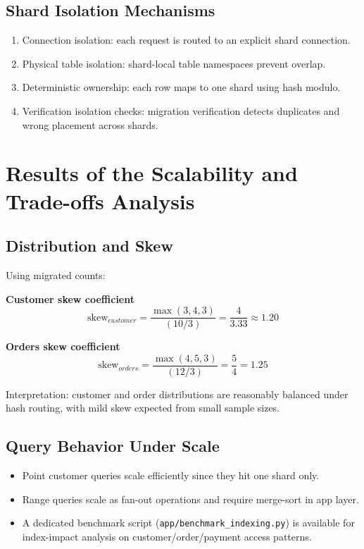 \documentclass[12pt,a4paper]{article}
\begin{document}
\subsection{Shard Isolation Mechanisms}

\begin{enumerate}[leftmargin=*]
  \item Connection isolation: each request is routed to an explicit shard connection.
  \item Physical table isolation: shard-local table namespaces prevent overlap.
  \item Deterministic ownership: each row maps to one shard using hash modulo.
  \item Verification isolation checks: migration verification detects duplicates and
  wrong placement across shards.
\end{enumerate}

\section{Results of the Scalability and Trade-offs Analysis}

\subsection{Distribution and Skew}

Using migrated counts:

\textbf{Customer skew coefficient}
\[
\text{skew}_{customer} = \frac{\max(3,4,3)}{(10/3)} = \frac{4}{3.33} \approx 1.20
\]

\textbf{Orders skew coefficient}
\[
\text{skew}_{orders} = \frac{\max(4,5,3)}{(12/3)} = \frac{5}{4} = 1.25
\]

Interpretation:
customer and order distributions are reasonably balanced under hash routing,
with mild skew expected from small sample sizes.

\subsection{Query Behavior Under Scale}

\begin{itemize}[leftmargin=*]
  \item Point customer queries scale efficiently since they hit one shard only.
  \item Range queries scale as fan-out operations and require merge-sort in app layer.
  \item A dedicated benchmark script (\texttt{app/benchmark\_indexing.py}) is available
  for index-impact analysis on customer/order/payment access patterns.
\end{itemize}
\end{document}
